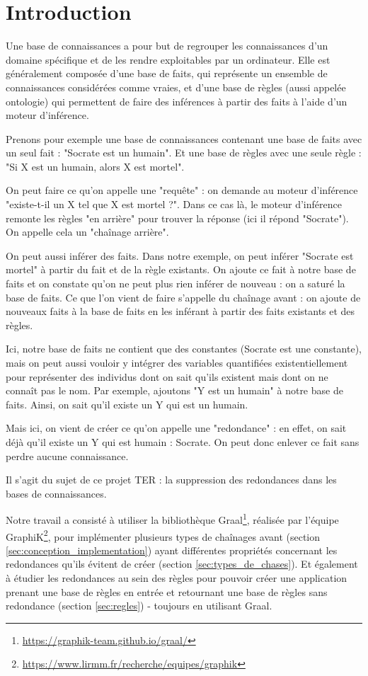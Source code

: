 \section{Introduction}

Une base de connaissances a pour but de regrouper les connaissances d'un domaine spécifique et de les rendre exploitables par un ordinateur. Elle est généralement composée d'une base de faits, qui représente un ensemble de connaissances considérées comme vraies, et d'une base de règles (aussi appelée ontologie) qui permettent de faire des inférences à partir des faits à l'aide d'un moteur d'inférence.
\par Prenons pour exemple une base de connaissances contenant une base de faits avec un seul fait : "Socrate est un humain". Et une base de règles avec une seule règle : "Si X est un humain, alors X est mortel". 
\par On peut faire ce qu'on appelle une "requête" : on demande au moteur d'inférence "existe-t-il un X tel que X est mortel ?". Dans ce cas là, le moteur d'inférence remonte les règles "en arrière" pour trouver la réponse (ici il répond "Socrate"). On appelle cela un "chaînage arrière".
\par On peut aussi inférer des faits. Dans notre exemple, on peut inférer "Socrate est mortel" à partir du fait et de la règle existants. On ajoute ce fait à notre base de faits et on constate qu'on ne peut plus rien inférer de nouveau : on a saturé la base de faits. Ce que l'on vient de faire s'appelle du chaînage avant : on ajoute de nouveaux faits à la base de faits en les inférant à partir des faits existants et des règles. 
\par Ici, notre base de faits ne contient que des constantes (Socrate est une constante), mais on peut aussi vouloir y intégrer des variables quantifiées existentiellement pour représenter des individus dont on sait qu'ils existent mais dont on ne connaît pas le nom. Par exemple, ajoutons "Y est un humain" à notre base de faits. Ainsi, on sait qu'il existe un Y qui est un humain. 
\par Mais ici, on vient de créer ce qu'on appelle une "redondance" : en effet, on sait déjà qu'il existe un Y qui est humain : Socrate. On peut donc enlever ce fait sans perdre aucune connaissance.
\par Il s'agit du sujet de ce projet TER : la suppression des redondances dans les bases de connaissances.
\par Notre travail a consisté à utiliser la bibliothèque Graal\footnote{\url{https://graphik-team.github.io/graal/}}, réalisée par l'équipe GraphiK\footnote{\url{https://www.lirmm.fr/recherche/equipes/graphik}}, pour implémenter plusieurs types de chaînages avant (section \ref{sec:conception_implementation}) ayant différentes propriétés concernant les redondances qu'ils évitent de créer (section \ref{sec:types_de_chases}). Et également à étudier les redondances au sein des règles pour pouvoir créer une application prenant une base de règles en entrée et retournant une base de règles sans redondance (section \ref{sec:regles}) - toujours en utilisant Graal.
